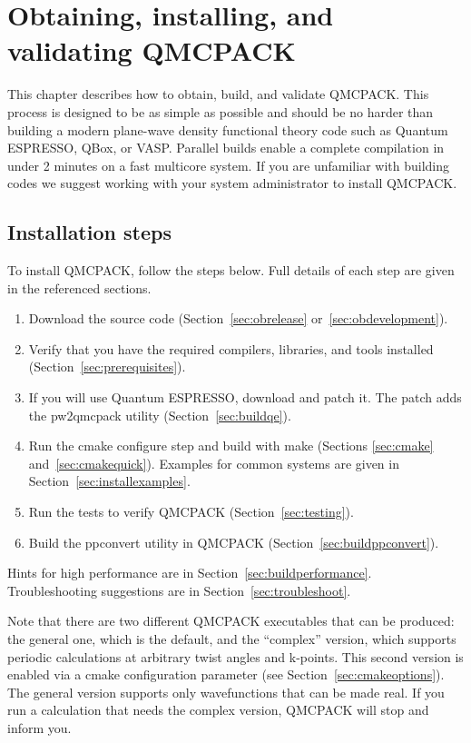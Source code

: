 \chapter{Obtaining, installing, and validating QMCPACK}
\label{chap:obtaininginstalling}

This chapter describes how to obtain, build, and validate QMCPACK. This process is designed to be as simple as
possible and should be no harder than building a modern plane-wave density
functional theory code such as Quantum ESPRESSO, QBox, or
VASP. Parallel builds enable a complete
compilation in under 2 minutes on a fast multicore system. If you
are unfamiliar with building codes we suggest working with your system
administrator to install QMCPACK.

\section{Installation steps}
To install QMCPACK, follow the steps below. Full details of
each step are given in the referenced sections.
\begin{enumerate}
\item Download the source code (Section~\ref{sec:obrelease} or~\ref{sec:obdevelopment}).
\item Verify that you have the required compilers, libraries, and tools
  installed (Section~\ref{sec:prerequisites}).
\item If you will use Quantum ESPRESSO, download and patch it. The patch adds the
  pw2qmcpack utility (Section~\ref{sec:buildqe}).
\item Run the cmake configure step and build with make (Sections
  \ref{sec:cmake} and~\ref{sec:cmakequick}). Examples for common
  systems are given in Section~\ref{sec:installexamples}.
\item Run the tests to verify QMCPACK (Section~\ref{sec:testing}).
\item Build the ppconvert utility in QMCPACK (Section~\ref{sec:buildppconvert}).
\end{enumerate}

Hints for high performance are in Section~\ref{sec:buildperformance}. Troubleshooting suggestions are in Section~\ref{sec:troubleshoot}.

Note that there are two different QMCPACK executables that can be
produced: the general one, which is the default, and the ``complex''
version, which supports periodic calculations at arbitrary twist angles and
k-points. This second version is enabled via a cmake configuration
parameter (see Section~\ref{sec:cmakeoptions}). The general version
 supports only wavefunctions that can be made real. If you run a
calculation that needs the complex version, QMCPACK will stop and inform you.

